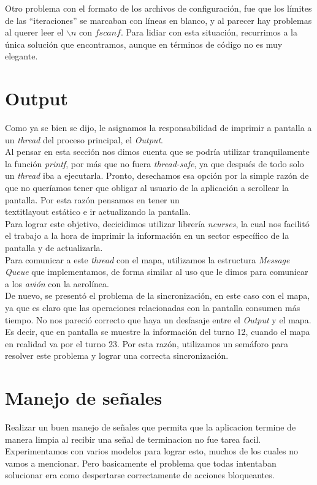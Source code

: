 \documentclass[a4paper,10pt]{article}
\begin{document}
Otro problema con el formato de los archivos de configuración, fue que los límites de las ``iteraciones'' se marcaban con líneas en blanco, y al parecer hay 
problemas al querer leer el $\backslash n$ con $fscanf$. Para lidiar con esta situación, recurrimos a la única solución que encontramos, aunque en términos de 
código no es muy elegante.\\

\newpage
\section{Output}

Como ya se bien se dijo, le asignamos la responsabilidad de imprimir a pantalla a un \textit{thread} del proceso principal, el \textit{Output}. \\

Al pensar en esta sección nos dimos cuenta que se podría utilizar tranquilamente la función \textit{printf}, por más que no fuera \textit{thread-safe},
 ya que después de todo solo un \textit{thread} iba a ejecutarla. Pronto, desechamos esa opción por la simple razón de que no queríamos tener que obligar al usuario 
de la aplicación a scrollear la pantalla. Por esta razón pensamos en tener un \\textit{layout} estático e ir actualizando la pantalla.\\
Para lograr este objetivo, decicidimos utilizar librería \textit{ncurses}, la cual nos facilitó el trabajo a la hora de imprimir la información en un sector específico
de la pantalla y de actualizarla.\\

Para comunicar a este \textit{thread} con el mapa, utilizamos la estructura \textit{Message Queue} que implementamos, de forma similar al uso que le dimos 
para comunicar a los \textit{avión} con la aerolínea.\\

De nuevo, se presentó el problema de la sincronización, en este caso con el mapa, ya que es claro que las operaciones relacionadas con la pantalla consumen más 
tiempo. No nos pareció correcto que haya un desfasaje entre el \textit{Output} y el mapa. Es decir, que en pantalla se muestre la información del turno 12, 
cuando el mapa en realidad va por el turno 23. Por esta razón, utilizamos un semáforo para resolver este problema y lograr una correcta sincronización.

\newpage
\section{Manejo de señales}
Realizar un buen manejo de señales que permita que la aplicacion termine de manera limpia al recibir una señal de terminacion no fue tarea facil.
Experimentamos con varios modelos para lograr esto, muchos de los cuales no vamos a mencionar.
Pero basicamente el problema que todas intentaban solucionar era como despertarse correctamente de acciones bloqueantes.
\end{document}
